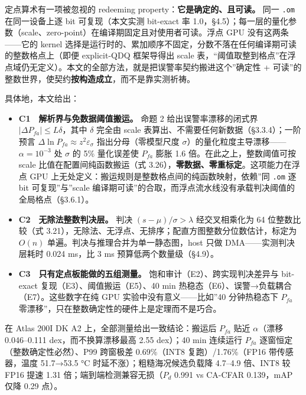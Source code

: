 定点算术有一项被忽视的 redeeming property：\textbf{它是确定的、且可读。}
同一 \texttt{.om} 在同一设备上逐 bit 可复现（本文实测 bit-exact 率
1.0，§4.5）；每一层的量化参数（scale、zero-point）在编译期固定且对使用者可读。浮点
GPU 没有这两条------它的 kernel
选择是运行时的、累加顺序不固定，分数不落在任何编译期可读的整数格点上（即便
explicit-QDQ 框架导得出 scale
表，``阈值取整到格点''在浮点域仍无定义）。本文的全部方法，就是把误警率契约搬进这个''确定性
+ 可读''的整数世界，使契约\textbf{按构造成立}，而不是靠实测祈祷。

具体地，本文给出：

\begin{itemize}
\tightlist
\item
  \textbf{C1　解析界与免数据阈值搬运。} 命题 2 给出误警率漂移的闭式界
  \(\lvert\Delta P_{fa}\rvert\le L\delta\)，其中 \(\delta\) 完全由 scale
  表算出、不需要任何新数据（§3.3.4）；一阶预言
  \(\Delta\ln P_{fa}\approx z^2\varepsilon_\sigma\) 指出分母（零模型尺度
  \(\sigma\)）的量化粒度主导漂移------\(\alpha=10^{-3}\) 处 \(\sigma\)
  的 5\% 量化误差使 \(P_{fa}\) 膨胀 1.6 倍。在此之上，整数阈值可按 scale 比值在配置间纯函数搬运（式
  3.26），\textbf{零数据、零重标定}。这项能力在浮点 GPU
  上无处定义：搬运规则是整数格点间的纯函数映射，依赖''同 \texttt{.om} 逐
  bit 可复现''与''scale
  编译期可读''的合取，而浮点流水线没有承载判决阈值的全局格点（§3.6.1）。
\item
  \textbf{C2　无除法整数判决层。} 判决 \((s-\mu)/\sigma>\lambda\)
  经交叉相乘化为 64 位整数比较（式
  3.21），无除法、无浮点、无排序；配直方图整数分位数估计，标定为
  \(O(n)\) 单遍。判决与推理合并为单一静态图，host 只做
  DMA------实测判决层耗时 0.024 ms，比 3 ms 预算低两个数量级（§4.9）。
\item
  \textbf{C3　只有定点板能做的五组测量。}
  饱和审计（E2）、跨实现判决差异与 bit-exact
  复现（E3）、阈值搬运（E5）、40 min
  热稳态（E6）、误警→负载耦合（E7）。这些数字在纯 GPU
  实验中没有意义------比如''40 分钟热稳态下 \(P_{fa}\)
  零漂移''，只在整数确定性的硬件上是定理而不是巧合。
\end{itemize}

在 Atlas 200I DK A2 上，全部测量给出一致结论：搬运后 \(P_{fa}\) 贴近
\(\alpha\)（漂移 0.046--0.111 dex，而不换算漂移最高 2.55 dex）；40 min
连续运行 \(P_{fa}\) 逐窗恒定（整数确定性必然）、P99 跨窗极差
0.69\%（INT8 复跑）/1.76\%（FP16 带传感器，温度 51.7→53.5 °C
时延不涨）；粗糙海况候选负载降 4.7--4.9 倍、INT8 较 FP16 提速 1.31
倍；端到端检测兼容无损（\(P_d\) 0.991 vs CA-CFAR 0.139，mAP 仅降 0.29
点）。


